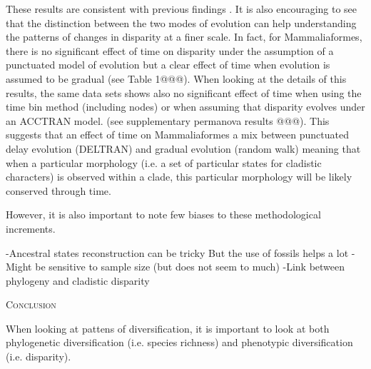 \documentclass[12pt,letterpaper]{article}
\renewcommand{\section}[1]{%
\bigskip
\begin{center}
\begin{Large}
\normalfont\scshape #1
\medskip
\end{Large}
\end{center}}
\begin{document}
\begin{enumerate}
    These results are consistent with previous findings \cite{Hunt20112007,Hunt21042015}.
    It is also encouraging to see that the distinction between the two modes of evolution can help understanding the patterns of changes in disparity at a finer scale.
    In fact, for Mammaliaformes, there is no significant effect of time on disparity under the assumption of a punctuated model of evolution but a clear effect of time when evolution is assumed to be gradual (see Table 1@@@).
    When looking at the details of this results, the same data sets shows also no significant effect of time when using the time bin method (including nodes) or when assuming that disparity evolves under an ACCTRAN model. (see supplementary permanova results @@@).
    This suggests that an effect of time on Mammaliaformes a mix between punctuated delay evolution (DELTRAN) and gradual evolution (random walk) meaning that when a particular morphology (i.e. a set of particular states for cladistic characters) is observed within a clade, this particular morphology will be likely conserved through time.
\end{enumerate}

However, it is also important to note few biases to these methodological increments.

    -Ancestral states reconstruction can be tricky
        But the use of fossils helps a lot \citep{Poly2001,Finarelli2006,Albert2009,Slater2012MEE}
    -Might be sensitive to sample size (but does not seem to much)
    -Link between phylogeny and cladistic disparity

%
%

\section{Conclusion}
When looking at pattens of diversification, it is important to look at both phylogenetic diversification (i.e. species richness) and phenotypic diversification (i.e. disparity).
\end{document}
